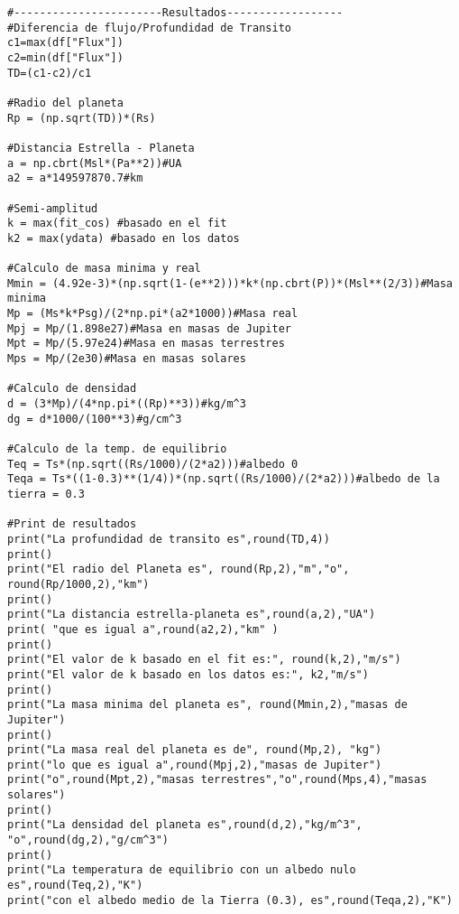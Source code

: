 \documentclass[12pt,letterpaper]{article}
\begin{document}
\begin{verbatim}
#-----------------------Resultados------------------
#Diferencia de flujo/Profundidad de Transito
c1=max(df["Flux"])  
c2=min(df["Flux"])
TD=(c1-c2)/c1

#Radio del planeta
Rp = (np.sqrt(TD))*(Rs)

#Distancia Estrella - Planeta 
a = np.cbrt(Msl*(Pa**2))#UA
a2 = a*149597870.7#km

#Semi-amplitud
k = max(fit_cos) #basado en el fit
k2 = max(ydata) #basado en los datos

#Calculo de masa minima y real
Mmin = (4.92e-3)*(np.sqrt(1-(e**2)))*k*(np.cbrt(P))*(Msl**(2/3))#Masa minima
Mp = (Ms*k*Psg)/(2*np.pi*(a2*1000))#Masa real
Mpj = Mp/(1.898e27)#Masa en masas de Jupiter
Mpt = Mp/(5.97e24)#Masa en masas terrestres
Mps = Mp/(2e30)#Masa en masas solares

#Calculo de densidad
d = (3*Mp)/(4*np.pi*((Rp)**3))#kg/m^3
dg = d*1000/(100**3)#g/cm^3

#Calculo de la temp. de equilibrio
Teq = Ts*(np.sqrt((Rs/1000)/(2*a2)))#albedo 0
Teqa = Ts*((1-0.3)**(1/4))*(np.sqrt((Rs/1000)/(2*a2)))#albedo de la tierra = 0.3

#Print de resultados
print("La profundidad de transito es",round(TD,4)) 
print()
print("El radio del Planeta es", round(Rp,2),"m","o", round(Rp/1000,2),"km")
print()
print("La distancia estrella-planeta es",round(a,2),"UA")
print( "que es igual a",round(a2,2),"km" )
print()
print("El valor de k basado en el fit es:", round(k,2),"m/s")
print("El valor de k basado en los datos es:", k2,"m/s")
print()
print("La masa minima del planeta es", round(Mmin,2),"masas de Jupiter")
print()
print("La masa real del planeta es de", round(Mp,2), "kg")
print("lo que es igual a",round(Mpj,2),"masas de Jupiter")
print("o",round(Mpt,2),"masas terrestres","o",round(Mps,4),"masas solares")
print()
print("La densidad del planeta es",round(d,2),"kg/m^3", "o",round(dg,2),"g/cm^3")
print()
print("La temperatura de equilibrio con un albedo nulo es",round(Teq,2),"K")
print("con el albedo medio de la Tierra (0.3), es",round(Teqa,2),"K")
\end{verbatim}
\end{document}
